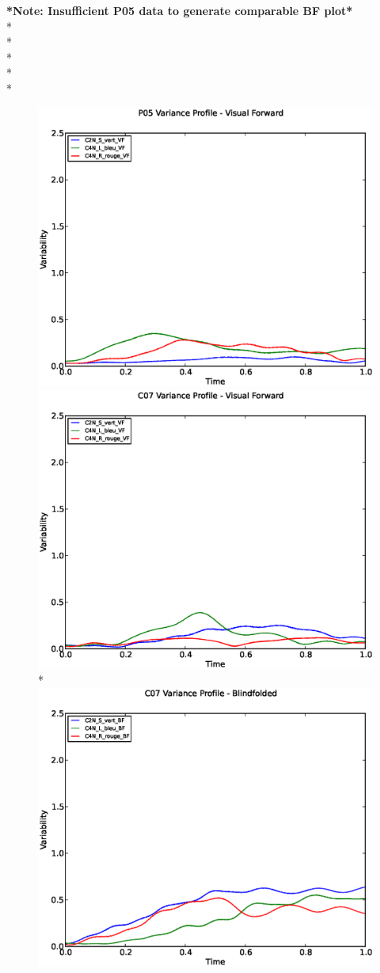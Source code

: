 \documentclass[a4page,landscape,twocolumn,10pt]{article}
\begin{document}
\newpage
\textbf{*Note: Insufficient P05 data to generate comparable BF plot*}
\\*
\\*
\\*
\\*
\\*
\begin{figure}[!htbp]
  \centering
  \includegraphics[width=0.45\linewidth]{P05_Variability_profile_VF.eps}
  \includegraphics[width=0.45\linewidth]{C07_Variability_profile_VF.eps}
  \\*
  \includegraphics[width=0.45\linewidth]{C07_Variability_profile_BF.eps}
\end{figure}

\clearpage
\end{document}

